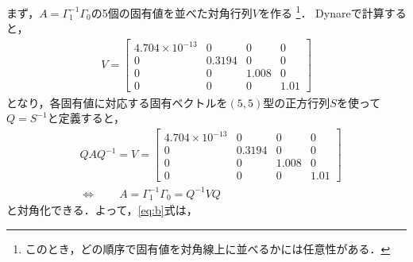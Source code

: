 \documentclass[dvipdfmx]{jlreq}
\begin{document}
まず，$A = \Gamma_1^{-1} \Gamma_0$の5個の固有値を並べた対角行列$V$を作る
\footnote{このとき，どの順序で固有値を対角線上に並べるかには任意性がある．}．
Dynareで計算すると，
\begin{align}
  V =
  \begin{bmatrix}
    4.704 \times 10^{-13} & 0 & 0 & 0 \\
    0 & 0.3194 & 0 & 0 \\
    0 & 0 & 1.008 & 0 \\
    0 & 0 & 0 & 1.01
  \end{bmatrix}
\end{align}
となり，各固有値に対応する固有ベクトルを$(5, 5)$型の正方行列$S$を使って$Q=S^{-1}$と定義すると，
\begin{equation}
  \begin{split}
    & Q A Q^{-1} = V =
    \begin{bmatrix}
      4.704 \times 10^{-13} & 0 & 0 & 0 \\
      0 & 0.3194 & 0 & 0 \\
      0 & 0 & 1.008 & 0 \\
      0 & 0 & 0 & 1.01
    \end{bmatrix} \\
    & \Leftrightarrow \qquad A = \Gamma_1^{-1} \Gamma_0 = Q^{-1} V Q
  \end{split}
\end{equation}
と対角化できる．よって，\eqref{eq:b}式は，
\end{document}
